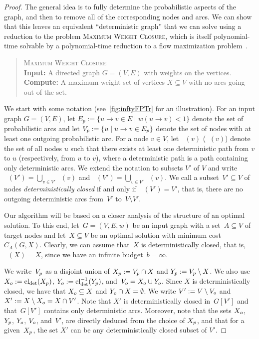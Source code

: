 \documentclass{article}
\DeclareMathOperator{\dcl}{cl_{det}}
\DeclareMathOperator{\idcl}{\ensuremath{cl_{det}^{-1}}}
\newcommand{\probSharpDef}[3]{
  \begin{quote}
    #1 \\
    \textbf{Input:} #2 \\
    \textbf{Compute:} #3
  \end{quote}
}
\newcommand{\probClosure}{\textsc{Maximum Weight Closure}\xspace}
\begin{document}
\begin{proof}
  The general idea is to fully determine the probabilistic aspects of the graph,
  and then to remove all of the corresponding nodes and arcs.
  We can show that this leaves an equivalent ``deterministic graph'' that we can solve using a reduction to 
  the problem \probClosure,
  which is itself polynomial-time solvable by a polynomial-time reduction to a flow maximization problem~\cite[Chapter~19]{AMO93}.
  \probSharpDef
    {\probClosure}
    {A directed graph $G = (V, E)$ with weights on the vertices.}
    {A maximum-weight set of vertices $X \subseteq V$  with no arcs going out of the set.}    
  We start with some notation (see~\autoref{fig:inftyFPTr} for an illustration).
  For an input graph $G = (V, E)$,
  let $E_p:=\{u\to v\in E\mid w(u\to v)<1\}$ denote the set of
  probabilistic arcs
  and let $V_p := \{u \mid u \to v \in E_p\}$ denote the set of
  nodes with at least one outgoing probabilistic arc.
  For a node $v\in V$, let
  $\dcl(v)$
  ($\idcl(v)$)
  denote the set of all nodes $u$ such that there exists at least
  one deterministic path
  from $v$ to $u$
  (respectively, from $u$ to $v$),
  where a deterministic path is a path containing only deterministic arcs.
  We extend the notation to subsets $V'$ of $V$ and write
  $\dcl(V') = \bigcup_{v \in V'} \dcl(v)$
  and
  $\idcl(V') = \bigcup_{v \in V'} \idcl(v)$.
  We call a subset~$V'\subseteq V$ of nodes
  \emph{deterministically closed} if and only if~$\dcl(V')=V'$,
  that is, there are no outgoing deterministic arcs from~$V'$ to~$V\setminus V'$.
  
  Our algorithm will be based on a closer analysis of
  the structure of an optimal solution.
  To this end, let~$G=(V,E,w)$ be an input graph with a
  set~$A\subseteq V$ of target nodes and let~$X\subseteq V$ be an
  optimal solution with minimum cost~$C_A(G,X)$.
  Clearly, we can assume that~$X$ is deterministically closed, that
  is,~$\dcl(X)=X$, since we have an infinite budget~$b=\infty$.
         
        We write~$V_p$ as a disjoint union of $X_p:=V_p\cap X$ and $Y_p:=V_p\setminus X$.
	We also use $\Xplus:=\dcl(\Xp)$, $\Yplus:=\idcl(\Yp)$, and~$V_{o}=X_{o}\cup Y_{o}$.
	Since $X$ is deterministically closed, we have that $X_{o} \subseteq X$ and $Y_{o}\cap X = \emptyset$.
	We write $V':=V\setminus V_{o}$ and $X':=X\setminus X_{o}=X\cap V'$. 
	Note that $X'$ is deterministically closed in~$G[V']$ and that~$G[V']$ contains only deterministic arcs.
	Moreover, note that the sets $X_{o}$, $Y_p$, $Y_{o}$, $V_{o}$, and~$V'$, are directly deduced from the choice of $X_p$,
	and that for a given~$X_p$, the set $X'$ can be any deterministically
        closed subset of $V'$.
  

\end{proof}
\end{document}
